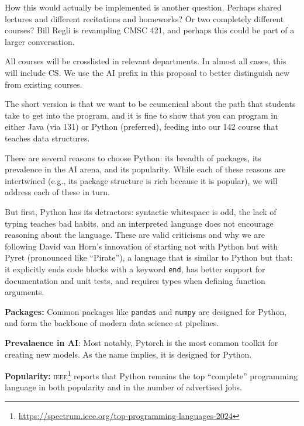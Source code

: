 How this would actually be implemented is another question.  Perhaps shared lectures and different recitations and homeworks?  Or two completely different courses?  Bill Regli is revampling CMSC 421, and perhaps this could be part of a larger conversation.


All courses will be crosslisted in relevant departments.  In almost all cases, this will include CS.  We use the AI prefix in this proposal to better distinguish new from existing courses.



The short version is that we want to be ecumenical about the path that students take to get into the program, and it is fine to show that you can program in either Java (via 131) or Python (preferred), feeding into our 142 course that teaches data structures.

There are several reasons to choose Python: its breadth of packages, its prevalence in the AI arena, and its popularity.  While each of these reasons are intertwined (e.g., its package structure is rich because it is popular), we will address each of these in turn.

But first, Python has its detractors: syntactic whitespace is odd, the lack of typing teaches bad habits, and an interpreted language does not encourage reasoning about the language.  These are valid criticisms and why we are following David van Horn's innovation of starting not with Python but with Pyret (pronounced like ``Pirate''), a language that is similar to Python but that: it explicitly ends code blocks with a keyword \texttt{end}, has better support for documentation and unit tests, and requires types when defining function arguments.

\textbf{Packages:} Common packages like \texttt{pandas} and \texttt{numpy} are designed for Python, and form the backbone of modern data science at \ai{} pipelines.

\textbf{Prevalaence in AI}: Most notably, Pytorch is the most common toolkit for creating new \ai{} models.  As the name implies, it is designed for Python.  

\textbf{Popularity:} \textsc{ieee}\footnote{\url{https://spectrum.ieee.org/top-programming-languages-2024}} reports that Python remains the top ``complete'' programming language in both popularity and in the number of advertised jobs.

